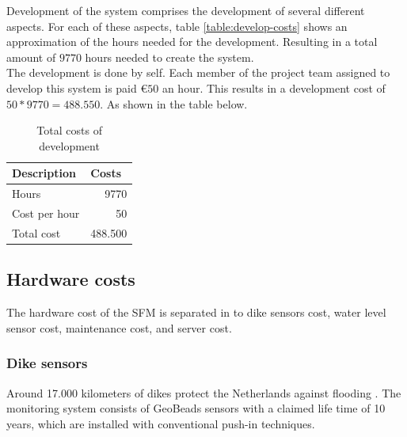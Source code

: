 Development of the system comprises the development of several different aspects. For each of these aspects, table \ref{table:develop-costs} shows an approximation of the hours needed for the development. Resulting in a total amount of $9770$ hours needed to create the system.\\
The development is done by \CompanyName self. Each member of the project team assigned to develop this system is paid $\euro{}50$ an hour. This results in a development cost of $50*9770=488.550$. As shown in the table below.



\begin{table}[H]
	\centering
	\begin{tabular}{lr}
	\toprule
	\textbf{Description} & \multicolumn{1}{l}{\textbf{Costs}} \\ \hline
	Hours & 9770 \\
	Cost per hour & \EUR{}50 \\
	Total cost & \EUR{}488.500 \\
	\bottomrule
	\end{tabular}
	\caption{Total costs of development}
	\label{table:total-dev-costs1}
\end{table}

\subsection{Hardware costs}
The hardware cost of the \gls{SFM} is separated in to dike sensors cost, water level sensor cost, maintenance cost, and server cost.

\subsubsection{Dike sensors}
Around 17.000 kilometers of dikes protect the Netherlands against flooding \cite{DMC}. 
The monitoring system consists of GeoBeads sensors with a claimed life time of 10 years, which are installed with conventional push-in techniques. 

